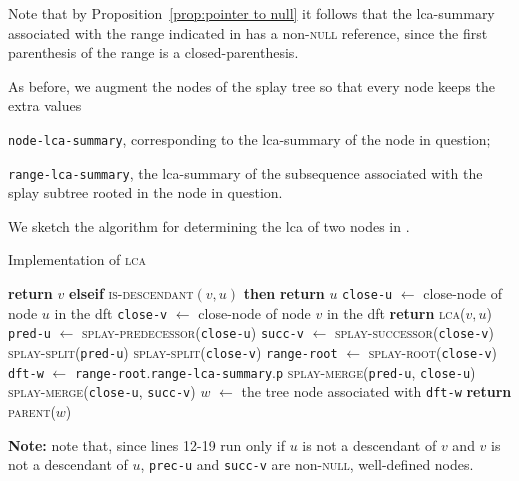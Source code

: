 \documentclass[a4paper,USenglish]{lipics}
\newcommand{\var}[1]{\textrm{\texttt{#1}}}
\begin{document}
			Note that by Proposition~\ref{prop:pointer to null} it follows that the lca-summary associated with the range indicated in  has a non-\textsc{null} reference, since the first parenthesis of the range is a closed-parenthesis.
			
			As before, we augment the nodes of the splay tree so that every node keeps the extra values
			\begin{compactitem}
				\item \var{node-lca-summary}, corresponding to the lca-summary of the node in question;
				\item \var{range-lca-summary}, the lca-summary of the subsequence associated with the splay subtree rooted in the node in question.
			\end{compactitem}
			
			We sketch the algorithm for determining the lca of two nodes in .
			\begin{algorithm}[H]
			  \small
			  \caption{\small Implementation of \textsc{lca}}
			  \label{algo:lca}
			  \begin{algorithmic}[1]
				    	\State \textbf{return} $v$
				    \State\hspace{-\algorithmicindent}\textbf{elseif} \textsc{is-descendant}$(v,u)$ \textbf{then}
				    	\State \textbf{return} $u$
				    \EndIf
				    \State \var{close-u} $\gets$ close-node of node $u$ in the dft
				    \State \var{close-v} $\gets$ close-node of node $v$ in the dft
				    \If{\textsc{splay-precedes}(\var{close-v},\var{close-u})}
				    	\State \textbf{return} \textsc{lca}($v,u$)
				    \Else
				    	\State \var{pred-u} $\gets$ \textsc{splay-predecessor}(\var{close-u})
				    	\State \var{succ-v} $\gets$ \textsc{splay-successor}(\var{close-v})
				    	\State \textsc{splay-split}(\var{pred-u})
				    	\State \textsc{splay-split}(\var{close-v})
				   		\State \var{range-root} $\gets$ \textsc{splay-root}(\var{close-v})
				   		\State \var{dft-w} $\gets$ \var{range-root}.\var{range-lca-summary}.\var{p}
				   		\State \textsc{splay-merge}(\var{pred-u}, \var{close-u})
				   		\State \textsc{splay-merge}(\var{close-u}, \var{succ-v})
				   		\State $w$ $\gets$ the tree node associated with \var{dft-w}
				   		\State \textbf{return} \textsc{parent}($w$)
				    \EndIf
			    \EndProcedure
			  \end{algorithmic}
			  \textbf{Note:} note that, since lines 12-19 run only if $u$ is not a descendant of $v$ and $v$ is not a descendant of $u$, \var{prec-u} and \var{succ-v} are non-\textsc{null}, well-defined nodes.
			\end{algorithm}	
			
\end{document}
